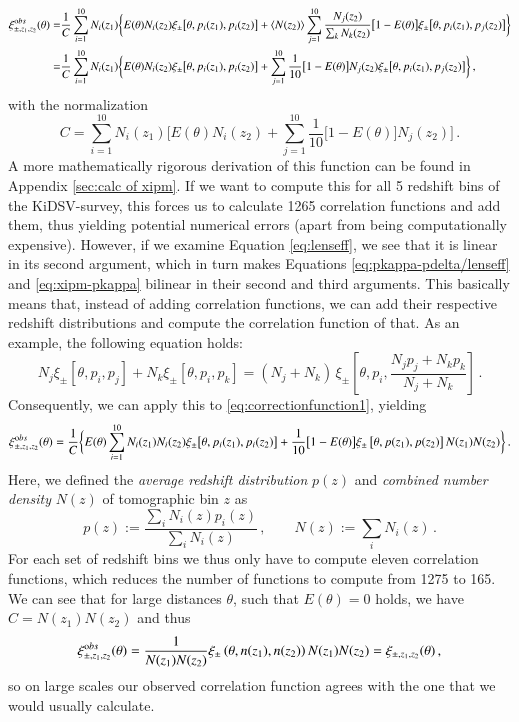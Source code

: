 \begin{align}
\xi_{\pm,z_1,z_2}^{\rm obs}(\theta) = & \frac{1}{C}\sum_{i=1}^{10} N_i(z_1) \bigg\{ E(\theta) N_i(z_2) \xi_\pm\big[\theta,p_i(z_1),p_i(z_2)\big] + \la N(z_2)\ra\sum_{j=1}^{10}\frac{  N_j(z_2)}{\sum_k N_k(z_2)} \big[1-E(\theta)\big]\xi_\pm\big[\theta,p_i(z_1),p_j(z_2)\big]\bigg\} \nonumber \\
 = & \frac{1}{C}\sum_{i=1}^{10} N_i(z_1) \bigg\{ E(\theta) N_i(z_2) \xi_\pm\big[\theta,p_i(z_1),p_i(z_2)\big] + \sum_{j=1}^{10}\frac{1}{10} \big[1-E(\theta)\big] N_j(z_2)\xi_\pm\big[\theta,p_i(z_1),p_j(z_2)\big]\bigg\}\, ,
\label{eq:correctionfunction1}
\end{align}
with the normalization
\[
C = \sum_{i=1}^{10} N_i(z_1) \bigg[ E(\theta)  N_i(z_2) + \sum_{j=1}^{10} \frac{1}{10} \big[1-E(\theta)\big] N_j(z_2)\bigg]\,.
\]
A more mathematically rigorous derivation of this function can be found in Appendix \ref{sec:calc of xipm}.
If we want to compute this for all 5 redshift bins of the KiDSV-survey, this forces us to calculate 1265 correlation functions and add them, thus yielding potential numerical errors (apart from being computationally expensive). However, if we examine Equation \eqref{eq:lenseff}, we see that it is linear in its second argument, which in turn makes Equations \eqref{eq:pkappa-pdelta/lenseff} and \eqref{eq:xipm-pkappa} bilinear in their second and third arguments. This basically means that, instead of adding correlation functions, we can add their respective redshift distributions and compute the correlation function of that. As an example, the following equation holds: \[
N_j\xi_\pm[\theta,p_i,p_j]+N_k\xi_\pm[\theta,p_i,p_k] = (N_j+N_k)\,\xi_\pm\left[\theta,p_i,\frac{N_jp_j+N_kp_k}{N_j+N_k}\right]\, .
\]
Consequently, we can apply this to \eqref{eq:correctionfunction1}, yielding
\begin{equation}
\xi_{\pm,z_1,z_2}^{\rm obs}(\theta) = \frac{1}{C}\bigg\{ E(\theta)\sum_{i=1}^{10} N_i(z_1)N_i(z_2) \xi_\pm\big[\theta,p_i(z_1),p_i(z_2)\big] +\frac{1}{10}\big[1-E(\theta)\big]\xi_\pm\left[\theta,p(z_1),p(z_2)\right]N(z_1)N(z_2)\bigg\}\, .
\label{eq:correctionfunction2}
\end{equation}
Here, we defined the \textit{average redshift distribution} $p(z)$ and \textit{combined number density} $N(z)$ of tomographic bin $z$ as \[
p(z):= \frac{\sum_i N_i(z)p_i(z)}{\sum_i N_i(z)}\, , \qquad N(z):=\sum_i N_i(z)\, .
\]
For each set of redshift bins we thus only have to compute eleven correlation functions, which reduces the number of functions to compute from 1275 to 165. We can see that for large distances $\theta$, such that $E(\theta)=0$ holds, we have $C=N(z_1)N(z_2)$ and thus \[
\xi_{\pm,z_1,z_2}^{\rm obs}(\theta) = \frac{1}{N(z_1)N(z_2)}\xi_\pm\left(\theta,n(z_1),n(z_2)\right)N(z_1)N(z_2) = \xi_{\pm,z_1,z_2}(\theta)\, ,
\]
so on large scales our observed correlation function agrees with the one that we would usually calculate.
